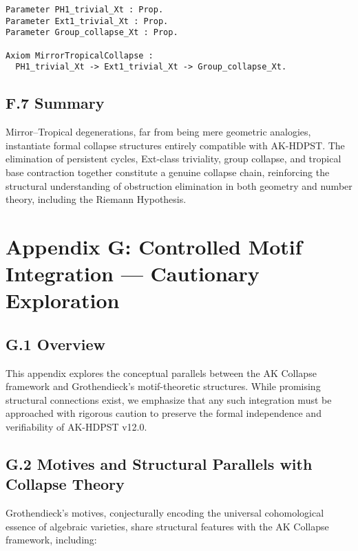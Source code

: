 \documentclass[11pt]{article}
\begin{document}
\begin{lstlisting}[language=Coq, caption=Coq Formalization of Mirror–Tropical Collapse, captionpos=b]
Parameter PH1_trivial_Xt : Prop.
Parameter Ext1_trivial_Xt : Prop.
Parameter Group_collapse_Xt : Prop.

Axiom MirrorTropicalCollapse :
  PH1_trivial_Xt -> Ext1_trivial_Xt -> Group_collapse_Xt.
\end{lstlisting}

\subsection*{F.7 Summary}

Mirror–Tropical degenerations, far from being mere geometric analogies, instantiate formal collapse structures entirely compatible with AK-HDPST. The elimination of persistent cycles, Ext-class triviality, group collapse, and tropical base contraction together constitute a genuine collapse chain, reinforcing the structural understanding of obstruction elimination in both geometry and number theory, including the Riemann Hypothesis.



\section*{Appendix G: Controlled Motif Integration — Cautionary Exploration}

\subsection*{G.1 Overview}

This appendix explores the conceptual parallels between the AK Collapse framework and Grothendieck's motif-theoretic structures. While promising structural connections exist, we emphasize that any such integration must be approached with rigorous caution to preserve the formal independence and verifiability of AK-HDPST v12.0.

\subsection*{G.2 Motives and Structural Parallels with Collapse Theory}

Grothendieck's motives, conjecturally encoding the universal cohomological essence of algebraic varieties, share structural features with the AK Collapse framework, including:
\end{document}
